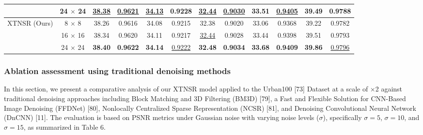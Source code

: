 \documentclass[twocolumn]{svjour3}          %
\begin{document}
\begin{table}
\begin{tabular}{|c|c|cc|cc|cc|cc|cc|}
            & {24 $\times$ 24} & \multicolumn{1}{c|}{\color{blue}\underline{38.38}} &{\color{blue}\underline{0.9621}}  & \multicolumn{1}{c|}{\color{blue}\underline{34.13}} &{\color{red}\textbf{0.9228}} & \multicolumn{1}{c|}{\color{blue}\underline{32.44}} &{\color{blue}\underline{0.9030}} & \multicolumn{1}{c|}{33.51} &{\color{blue}\underline{0.9405}}  & \multicolumn{1}{c|}{39.49} &{0.9788}  \\
  \hline
  \multirow{3}{*}{XTNSR (Ours)} & {8 $\times$ 8}  & \multicolumn{1}{c|}{38.26} &{0.9616}  & \multicolumn{1}{c|}{34.08} &{0.9215} & \multicolumn{1}{c|}{32.38} &{0.9020} & \multicolumn{1}{c|}{33.06} &{0.9368}  & \multicolumn{1}{c|}{39.22} &{0.9782} \\
            & {16 $\times$ 16}   & \multicolumn{1}{c|}{38.34} &{0.9620}  & \multicolumn{1}{c|}{34.11} &{0.9217} & \multicolumn{1}{c|}{\color{blue}\underline{32.44}} &{0.9028} & \multicolumn{1}{c|}{33.44} &{0.9398}  & \multicolumn{1}{c|}{39.51} &{0.9793} \\
            & {24 $\times$ 24} & \multicolumn{1}{c|}{\color{red}\textbf{38.40}} &{\color{red}\textbf{0.9622}}  & \multicolumn{1}{c|}{\color{red}\textbf{34.14}} &{\color{blue}\underline{0.9222}} & \multicolumn{1}{c|}{\color{red}\textbf{32.48}} &{\color{red}\textbf{0.9034}} & \multicolumn{1}{c|}{\color{red}\textbf{33.68}} &{\color{red}\textbf{0.9409}}  & \multicolumn{1}{c|}{\color{red}\textbf{39.86}} &{\color{blue}\underline{0.9796}}  \\
  \hline
\end{tabular}
\end{table}

\subsubsection{Ablation assessment using traditional denoising methods}

In this section, we present a comparative analysis of our XTNSR model applied to the Urban100 [73] Dataset at a scale of ×2 against traditional denoising approaches including Block Matching and 3D Filtering (BM3D) [79], a Fast and Flexible Solution for CNN-Based Image Denoising (FFDNet) [80], Nonlocally Centralized Sparse Representation (NCSR) [81], and Denoising Convolutional Neural Network (DnCNN) [11]. The evaluation is based on PSNR metrics under Gaussian noise with varying noise levels ($\sigma$), specifically $\sigma = 5$, $\sigma = 10$, and $\sigma = 15$, as summarized in Table 6.
\end{document}

